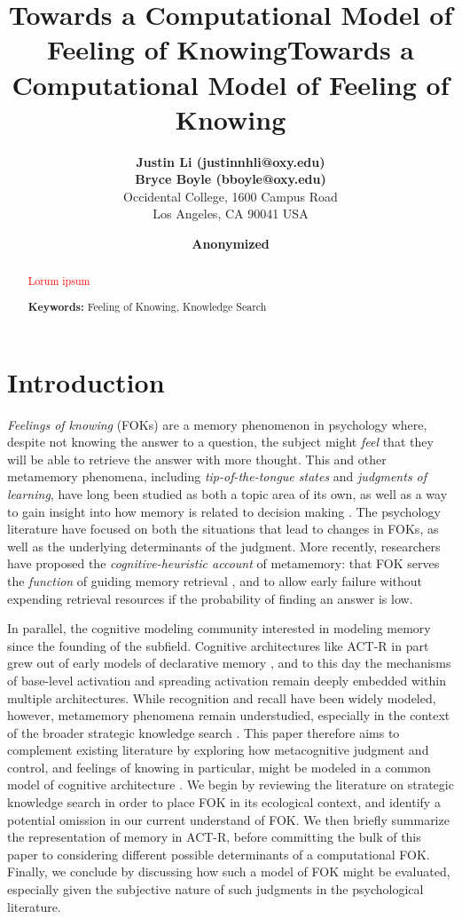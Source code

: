 \documentclass[10pt,letterpaper]{article}
\title{Towards a Computational Model of Feeling of Knowing}
\author{
        {\large \bf Justin Li (justinnhli@oxy.edu)} \\
        {\large \bf Bryce Boyle (bboyle@oxy.edu)} \\
        Occidental College, 1600 Campus Road \\
        Los Angeles, CA 90041 USA
    }
\title{Towards a Computational Model of Feeling of Knowing}
\author{
    {\large \bf Anonymized}
}
\newcommand{\fixme}[2][]{#2}
\renewcommand{\fixme}[2][]{\textcolor{red}{#2}}
\begin{document}
\maketitle

\begin{abstract}

    \fixme{Lorum ipsum}

    \textbf{Keywords:} Feeling of Knowing, Knowledge Search

\end{abstract}

\section{Introduction}

\emph{Feelings of knowing} (FOKs) are a memory phenomenon in psychology where, despite not knowing the answer to a question, the subject might \emph{feel} that they will be able to retrieve the answer with more thought.
This and other metamemory phenomena, including \emph{tip-of-the-tongue states} and \emph{judgments of learning}, have long been studied as both a topic area of its own, as well as a way to gain insight into how memory is related to decision making \cite{Nelson1994WhyInvestigateMetacognition}.
The psychology literature have focused on both the situations that lead to changes in FOKs, as well as the underlying determinants of the judgment.
More recently, researchers have proposed the \emph{cognitive-heuristic account} of metamemory: that FOK serves the \emph{function} of guiding memory retrieval \cite{Schwartz2011TipOfThe}, and to allow early failure without expending retrieval resources if the probability of finding an answer is low.

In parallel, the cognitive modeling community interested in modeling memory since the founding of the subfield.
Cognitive architectures like ACT-R \cite{Anderson2007HowCanThe} in part grew out of early models of declarative memory \cite{Anderson1983ASpreadingActivation, Anderson1991ReflectionsOfThe}, and to this day the mechanisms of base-level activation and spreading activation remain deeply embedded within multiple architectures.
While recognition and recall have been widely modeled, however, metamemory phenomena remain understudied, especially in the context of the broader strategic knowledge search \cite{Newell1972HumanProblemSolving}.
This paper therefore aims to complement existing literature by exploring how metacognitive judgment and control, and feelings of knowing in particular, might be modeled in a common model of cognitive architecture \cite{Laird2017AStandardModel}.
We begin by reviewing the literature on strategic knowledge search in order to place FOK in its ecological context, and identify a potential omission in our current understand of FOK.
We then briefly summarize the representation of memory in ACT-R, before committing the bulk of this paper to considering different possible determinants of a computational FOK.
Finally, we conclude by discussing how such a model of FOK might be evaluated, especially given the subjective nature of such judgments in the psychological literature.
\end{document}
